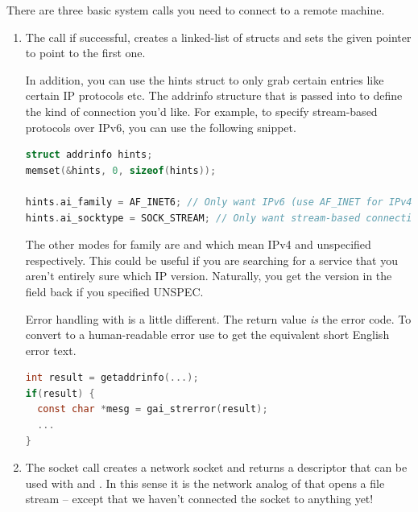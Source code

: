 There are three basic system calls you need to connect to a remote machine.

\begin{enumerate}

\item {}

The  call if successful, creates a linked-list of  structs and sets the given pointer to point to the first one.

In addition, you can use the hints struct to only grab certain entries like certain IP protocols etc.
The addrinfo structure that is passed into  to define the kind of connection you'd like.
For example, to specify stream-based protocols over IPv6, you can use the following snippet.

\begin{lstlisting}[language=C]
struct addrinfo hints;
memset(&hints, 0, sizeof(hints));

hints.ai_family = AF_INET6; // Only want IPv6 (use AF_INET for IPv4)
hints.ai_socktype = SOCK_STREAM; // Only want stream-based connection
\end{lstlisting}

The other modes for family are  and  which mean IPv4 and unspecified respectively.
This could be useful if you are searching for a service that you aren't entirely sure which IP version.
Naturally, you get the version in the field back if you specified UNSPEC.

Error handling with  is a little different.
The return value \emph{is} the error code.
To convert to a human-readable error use  to get the equivalent short English error text.

\begin{lstlisting}[language=C]
int result = getaddrinfo(...);
if(result) {
  const char *mesg = gai_strerror(result);
  ...
}
\end{lstlisting}


\item {}

The socket call creates a network socket and returns a descriptor that can be used with  and .
In this sense it is the network analog of  that opens a file stream -- except that we haven't connected the socket to anything yet!


\end{enumerate}

